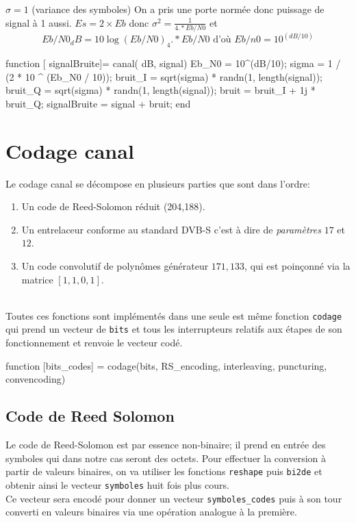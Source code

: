 \documentclass[a4paper,11pt]{article}
\newcommand{\ds}{\displaystyle}
\begin{document}
$\sigma = 1$ (variance des symboles)
On a pris une porte normée donc puissage de signal à 1 aussi.
$Es=2 \times Eb$  donc $\ds \sigma^2 = \frac{1}{4.*Eb/N0}$
et $$Eb/N0_dB = 10\log(Eb/N0) _4.*Eb/N0 \text{ d'où } Eb/n0 = 10^{(dB/10)}$$


\begin{lstun}
	function [ signalBruite]= canal( dB, signal)
	Eb_N0 = 10^(dB/10);
	sigma = 1 / (2 * 10 ^ (Eb_N0 / 10));
	bruit_I = sqrt(sigma) * randn(1, length(signal));
	bruit_Q = sqrt(sigma) * randn(1, length(signal));
	bruit = bruit_I + 1j * bruit_Q;
	signalBruite = signal + bruit;
	end	
\end{lstun}

\section{Codage canal}
Le codage canal se décompose en plusieurs parties que sont dans l'ordre:
\begin{enumerate}
	\item Un code de Reed-Solomon réduit (204,188).
	\item Un entrelaceur conforme au standard DVB-S c'est à dire de \emph{paramètres} $17$ et $12$.
	\item Un code convolutif de polynômes générateur $171, 133$, qui est poinçonné via la matrice $[1,1,0,1]$.
\end{enumerate}
\ \\
Toutes ces fonctions sont implémentés dans une seule est même fonction \texttt{codage} qui prend un vecteur de \texttt{bits} et tous les interrupteurs relatifs aux étapes de son fonctionnement et renvoie le vecteur codé.

\begin{lstun}
function [bits_codes] = codage(bits, RS_encoding, interleaving, puncturing, convencoding)
\end{lstun}
\subsection{Code de Reed Solomon}
Le code de Reed-Solomon est par essence non-binaire; il prend en entrée des symboles qui dans notre cas seront des octets. Pour effectuer la conversion à partir de valeurs binaires, on va utiliser les fonctions \texttt{reshape} puis \texttt{bi2de} et obtenir ainsi le vecteur \texttt{symboles} huit fois plus cours. \\
Ce vecteur sera encodé pour donner un vecteur \texttt{symboles\_codes} puis à son tour converti en valeurs binaires via une opération analogue à la première.
\end{document}
